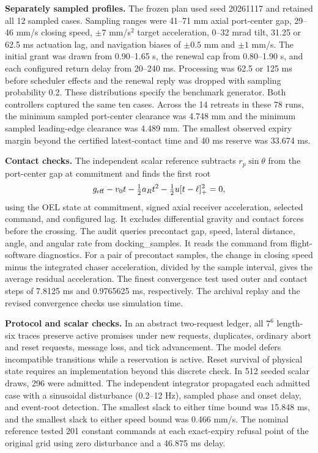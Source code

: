 \documentclass[10pt,letterpaper]{article}
\begin{document}
\textbf{Separately sampled profiles.} The frozen plan used seed 20261117 and retained all 12 sampled cases. Sampling ranges were 41--71 mm axial port-center gap, 29--46 mm/s closing speed, $\pm7$ mm/s$^2$ target acceleration, 0--32 mrad tilt, 31.25 or 62.5 ms actuation lag, and navigation biases of $\pm0.5$ mm and $\pm1$ mm/s. The initial grant was drawn from 0.90--1.65 s, the renewal cap from 0.80--1.90 s, and each configured return delay from 20--240 ms. Processing was 62.5 or 125 ms before scheduler effects and the renewal reply was dropped with sampling probability 0.2. These distributions specify the benchmark generator. Both controllers captured the same ten cases. Across the 14 retreats in these 78 runs, the minimum sampled port-center clearance was 4.748 mm and the minimum sampled leading-edge clearance was 4.489 mm. The smallest observed expiry margin beyond the certified latest-contact time and 40 ms reserve was 33.674 ms.

\textbf{Contact checks.} The independent scalar reference subtracts $r_p\sin\theta$ from the port-center gap at commitment and finds the first root
\[
  g_{\rm eff}-v_0t-\tfrac12 a_Rt^2-\tfrac12 u[t-\ell]_+^2=0 ,
\]
using the OEL state at commitment, signed axial receiver acceleration, selected command, and configured lag. It excludes differential gravity and contact forces before the crossing. The audit queries precontact gap, speed, lateral distance, angle, and angular rate from \textsf{docking\_samples}. It reads the command from flight-software diagnostics. For a pair of precontact samples, the change in closing speed minus the integrated chaser acceleration, divided by the sample interval, gives the average residual acceleration. The finest convergence test used outer and contact steps of 7.8125 ms and 0.9765625 ms, respectively. The archival replay and the revised convergence checks use simulation time.

\textbf{Protocol and scalar checks.} In an abstract two-request ledger, all $7^6$ length-six traces preserve active promises under new requests, duplicates, ordinary abort and reset requests, message loss, and tick advancement. The model defers incompatible transitions while a reservation is active. Reset survival of physical state requires an implementation beyond this discrete check. In 512 seeded scalar draws, 296 were admitted. The independent integrator propagated each admitted case with a sinusoidal disturbance (0.2--12 Hz), sampled phase and onset delay, and event-root detection. The smallest slack to either time bound was 15.848 ms, and the smallest slack to either speed bound was 0.466 mm/s. The nominal reference tested 201 constant commands at each exact-expiry refusal point of the original grid using zero disturbance and a 46.875 ms delay.
\end{document}
